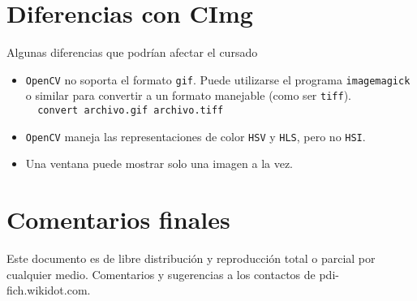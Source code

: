 \documentclass[11pt,a4paper,onecolumn]
{article}
\newcommand{\tc}[1]{\texttt{#1}}
\begin{document}
	\section{Diferencias con CImg}
		Algunas diferencias que podrían afectar el cursado
		\begin{itemize}
			\item \tc{OpenCV} no soporta el formato \tc{gif}. Puede utilizarse el programa \tc{imagemagick} o similar para convertir a un formato manejable (como ser \tc{tiff}).\\
				\verb|  convert archivo.gif archivo.tiff|
			\item \tc{OpenCV} maneja las representaciones de color \tc{HSV} y \tc{HLS}, pero no \tc{HSI}.
			\item Una ventana puede mostrar solo una imagen a la vez.
		\end{itemize}
	\section{Comentarios finales}
		Este documento es de libre distribución y reproducción total o parcial por cualquier medio. Comentarios y sugerencias a los contactos de pdi-fich.wikidot.com.
\end{document}
